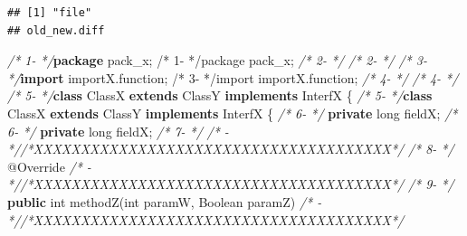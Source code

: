 \documentclass[
]{article}
\newenvironment{Shaded}{\begin{snugshade}}{\end{snugshade}}
\newcommand{\AttributeTok}[1]{\textcolor[rgb]{0.77,0.63,0.00}{#1}}
\newcommand{\BuiltInTok}[1]{#1}
\newcommand{\CommentTok}[1]{\textcolor[rgb]{0.56,0.35,0.01}{\textit{#1}}}
\newcommand{\DataTypeTok}[1]{\textcolor[rgb]{0.13,0.29,0.53}{#1}}
\newcommand{\FunctionTok}[1]{\textcolor[rgb]{0.00,0.00,0.00}{#1}}
\newcommand{\ImportTok}[1]{#1}
\newcommand{\KeywordTok}[1]{\textcolor[rgb]{0.13,0.29,0.53}{\textbf{#1}}}
\newcommand{\NormalTok}[1]{#1}
\begin{document}
\begin{landscape}

\small

\begin{verbatim}
## [1] "file"
## old_new.diff
\end{verbatim}

\normalsize

\scriptsize

\begin{Shaded}
\begin{Highlighting}[]
\CommentTok{/*  1-                 */}\KeywordTok{package}\ImportTok{ pack_x;                                                /*  1-                 */package pack_x;}                                                
\CommentTok{/*  2-                 */}                                                               \CommentTok{/*  2-                 */}                                                               
\CommentTok{/*  3-                 */}\KeywordTok{import}\ImportTok{ importX.function;                                       /*  3-                 */import importX.function;}                                       
\CommentTok{/*  4-                 */}                                                               \CommentTok{/*  4-                 */}                                                               
\CommentTok{/*  5-                 */}\KeywordTok{class}\NormalTok{ ClassX }\KeywordTok{extends}\NormalTok{ ClassY }\KeywordTok{implements}\NormalTok{ InterfX \{               }\CommentTok{/*  5-                 */}\KeywordTok{class}\NormalTok{ ClassX }\KeywordTok{extends}\NormalTok{ ClassY }\KeywordTok{implements}\NormalTok{ InterfX \{               }
\CommentTok{/*  6-                 */}    \KeywordTok{private} \DataTypeTok{long}\NormalTok{ fieldX;                                       }\CommentTok{/*  6-                 */}    \KeywordTok{private} \DataTypeTok{long}\NormalTok{ fieldX;                                       }
\CommentTok{/*  7-                 */}                                                               \CommentTok{/*   -                 *//*XXXXXXXXXXXXXXXXXXXXXXXXXXXXXXXXXXXXXX*/}                     
\CommentTok{/*  8-                 */}    \AttributeTok{@Override}                                                  \CommentTok{/*   -                 *//*XXXXXXXXXXXXXXXXXXXXXXXXXXXXXXXXXXXXXX*/}                     
\CommentTok{/*  9-                 */}    \KeywordTok{public} \DataTypeTok{int} \FunctionTok{methodZ}\NormalTok{(}\DataTypeTok{int}\NormalTok{ paramW, }\BuiltInTok{Boolean}\NormalTok{ paramZ)             }\CommentTok{/*   -                 *//*XXXXXXXXXXXXXXXXXXXXXXXXXXXXXXXXXXXXXX*/}                     

\end{Highlighting}
\end{Shaded}
\end{landscape}
\end{document}
